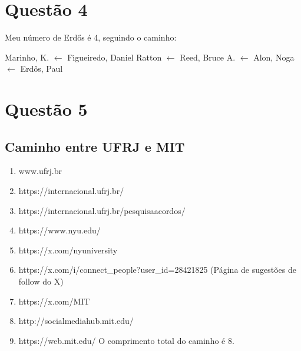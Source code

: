 \documentclass{article}
\begin{document}
\section{Questão 4}
Meu número de Erdős é 4, seguindo o caminho:

Marinho, K. {$\leftarrow$} Figueiredo, Daniel Ratton {$\leftarrow$} Reed, Bruce A. {$\leftarrow$} Alon, Noga {$\leftarrow$} Erdős, Paul

\section{Questão 5}
\subsection{Caminho entre UFRJ e MIT}
\begin{enumerate}
    \item www.ufrj.br
    \item https://internacional.ufrj.br/
    \item https://internacional.ufrj.br/pesquisaacordos/
    \item https://www.nyu.edu/
    \item https://x.com/nyuniversity
    \item https://x.com/i/connect\_people?user\_id=28421825 (Página de sugestões de follow do X)
    \item https://x.com/MIT
    \item http://socialmediahub.mit.edu/
    \item https://web.mit.edu/
    O comprimento total do caminho é 8.
\end{enumerate}
\end{document}
